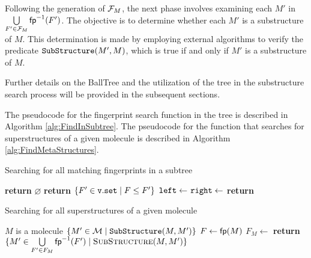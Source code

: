 Following the generation of $\mathcal{F}_M$, the next phase involves examining each $M'$ in $\bigcup\limits_{F' \in \mathcal{F}_M} {\sf fp}^{-1}(F')$. The 
objective is to determine whether each $M'$ is a substructure of $M$. This determination is made by employing external algorithms to verify the predicate $\verb|SubStructure|(M', M)$, which is true if and only if $M'$ is a substructure of $M$. 

Further details on the BallTree and the utilization of the tree in the substructure search process will be provided in the subsequent sections.



The pseudocode for the fingerprint search function in the tree is described in Algorithm \ref{alg:FindInSubtree}. The pseudocode for the function that searches for superstructures of a given molecule is described in Algorithm \ref{alg:FindMetaStructures}.

\begin{algorithm}[h!]
  \caption{Searching for all matching fingerprints in a subtree}\label{alg:FindInSubtree}
  \begin{algorithmic}[1]
     \label{alg:FindInSubtree:line:RecursionCut}
      \State \textbf{return} $\varnothing$
      \State \textbf{return} $\{F' \in {\tt v.set} \mid F \le F' \}$ 
    \Else
      \State ${\tt left} \gets $   
      \State ${\tt right} \gets $  
      \State \textbf{return}  
    \EndIf
    \EndProcedure
  \end{algorithmic}
\end{algorithm}

\begin{algorithm}[!ht]
  \caption{Searching for all superstructures of a given molecule} \label{alg:FindMetaStructures}
  \begin{algorithmic}[1]
    \Require $M $ is a molecule 
    \Ensure $\{M' \in \mathcal{M} \mid {\tt SubStructure}(M, M') \}$ 
    \State $F \gets {\sf fp}(M) $ 
    \State $F_M \gets $ 
    \State \textbf{return} $\{M' \in \bigcup\limits_{F' \in F_M} {\sf fp}^{-1}(F') \mid \Call{SubStructure}{M, M'}\}$ 
    \EndProcedure
  \end{algorithmic}
\end{algorithm}

